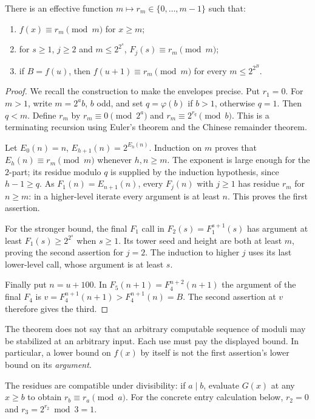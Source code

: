 \begin{theorem}\label{thm:envelope}
There is an effective function $m\mapsto r_m\in\{0,\ldots,m-1\}$ such
that:
\begin{enumerate}
\item $f(x)\equiv r_m\pmod m$ for $x\ge m$;
\item for $s\ge1$, $j\ge2$ and $m\le2^{2^s}$,
      $F_j(s)\equiv r_m\pmod m$;
\item if $B=f(u)$, then
      $f(u+1)\equiv r_m\pmod m$ for every $m\le2^{2^B}$.
\end{enumerate}
\end{theorem}
\begin{proof}
We recall the construction to make the envelopes precise. Put $r_1=0$.
For $m>1$, write $m=2^a b$, $b$ odd, and set
$q=\varphi(b)$ if $b>1$, otherwise $q=1$. Then $q<m$.
Define $r_m$ by
$r_m\equiv0\pmod {2^a}$ and
$r_m\equiv2^{r_q}\pmod b$. This is a terminating recursion using
Euler's theorem and the Chinese remainder theorem.

Let $E_0(n)=n$, $E_{h+1}(n)=2^{E_h(n)}$.
Induction on $m$ proves that $E_h(n)\equiv r_m\pmod m$ whenever
$h,n\ge m$. The exponent is large enough for the $2$-part; its residue
modulo $q$ is supplied by the induction hypothesis, since $h-1\ge q$.
As $F_1(n)=E_{n+1}(n)$, every $F_j(n)$ with $j\ge1$ has residue
$r_m$ for $n\ge m$: in a higher-level iterate every argument is at
least $n$. This proves the first assertion.

For the stronger bound, the final $F_1$ call in
$F_2(s)=F_1^{s+1}(s)$ has argument at least
$F_1(s)\ge2^{2^s}$ when $s\ge1$. Its tower seed and height are both
at least $m$, proving the second assertion for $j=2$.
The induction to higher $j$ uses its last lower-level call, whose
argument is at least $s$.

Finally put $n=u+100$. In
$F_5(n+1)=F_4^{n+2}(n+1)$ the argument of the final $F_4$ is
$v=F_4^{n+1}(n+1)>F_4^{n+1}(n)=B$. The second assertion at $v$
therefore gives the third.
\end{proof}

The theorem does not say that an arbitrary computable sequence of
moduli may be stabilized at an arbitrary input. Each use must pay the
displayed bound. In particular, a lower bound on $f(x)$ by itself is
not the first assertion's lower bound on its \emph{argument}.

The residues are compatible under divisibility: if $a\mid b$, evaluate
$G(x)$ at any $x\ge b$ to obtain $r_b\equiv r_a\pmod a$.
For the concrete entry calculation below, $r_2=0$ and
$r_3=2^{r_2}\bmod3=1$.

